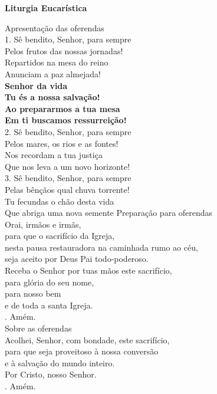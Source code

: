 \documentclass{book}
\begin{document}
\begin{center}
    \textbf{Liturgia Eucarística}
\end{center}
\begin{flushleft}
    \textcolor{VioletRed2}{Apresentação das oferendas}
    \vspace{.2cm} \\
    1. Sê bendito, Senhor, para sempre \\
    Pelos frutos das nossas jornadas! \\
    Repartidos na mesa do reino \\
    Anunciam a paz almejada!
    \vspace{.2cm} \\
    \textbf{Senhor da vida \\
        Tu és a nossa salvação! \\
        Ao prepararmos a tua mesa \\
        Em ti buscamos ressurreição!}
    \vspace{.2cm} \\
    2. Sê bendito, Senhor, para sempre \\
    Pelos mares, os rios e as fontes! \\
    Nos recordam a tua justiça \\
    Que nos leva a um novo horizonte! \\
    3. Sê bendito, Senhor, para sempre \\
    Pelas bênçãos qual chuva torrente! \\
    Tu fecundas o chão desta vida \\
    Que abriga uma nova semente
    \newpage
    \textcolor{VioletRed2}{Preparação para oferendas}
    \vspace{.2cm} \\
    Orai, irmãos e irmãs, \\
    para que o sacrifício da Igreja, \\
    nesta pausa restauradora na caminhada rumo ao céu, \\
    seja aceito por Deus Pai todo-poderoso.
    \vspace{.2cm} \\
    Receba o Senhor por tuas mãos este sacrifício, \\
    para glória do seu nome, \\
    para nosso bem \\
    e de toda a santa Igreja.
    \vspace{.2cm} \\
    {\color{VioletRed2} \Rbar.} Amém.
    \vspace{.2cm} \\
    \textcolor{VioletRed2}{Sobre as oferendas}
    \vspace{.2cm} \\
    Acolhei, Senhor, com bondade, este sacrifício, \\
    para que seja proveitoso à nossa conversão \\
    e à salvação do mundo inteiro. \\
    Por Cristo, nosso Senhor. \\
    {\color{VioletRed2} \Rbar.} Amém.
\end{flushleft}
\end{document}
